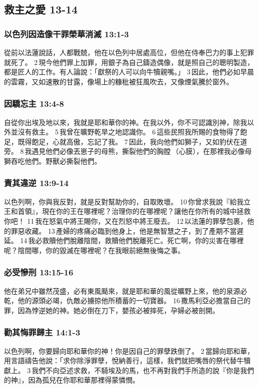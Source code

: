 \subsection{救主之愛 13-14}
\subsubsection{以色列因造像干罪榮華消滅 13:1-3}
從前以法蓮說話，人都戰兢，他在以色列中居處高位，但他在侍奉巴力的事上犯罪就死了。 2 現今他們罪上加罪，用銀子為自己鑄造偶像，就是照自己的聰明製造，都是匠人的工作。有人論說：「獻祭的人可以向牛犢親嘴。」 3 因此，他們必如早晨的雲霧，又如速散的甘露，像場上的糠秕被狂風吹去，又像煙氣騰於窗外。


\subsubsection{因驕忘主 13:4-8}
自從你出埃及地以來，我就是耶和華你的神。在我以外，你不可認識別神，除我以外並沒有救主。 5 我曾在曠野乾旱之地認識你。 6 這些民照我所賜的食物得了飽足，既得飽足，心就高傲，忘記了我。 7 因此，我向他們如獅子，又如豹伏在道旁。 8 我遇見他們必像丟崽子的母熊，撕裂他們的胸膛 （心膜），在那裡我必像母獅吞吃他們。野獸必撕裂他們。

\subsubsection{責其違逆 13:9-14}
以色列啊，你與我反對，就是反對幫助你的，自取敗壞。 10 你曾求我說『給我立王和首領』，現在你的王在哪裡呢？治理你的在哪裡呢？讓他在你所有的城中拯救你吧！ 11 我在怒氣中將王賜你，又在烈怒中將王廢去。 12 以法蓮的罪孽包裹，他的罪惡收藏。 13 產婦的疼痛必臨到他身上，他是無智慧之子，到了產期不當遲延。 14 我必救贖他們脫離陰間，救贖他們脫離死亡。死亡啊，你的災害在哪裡呢？陰間哪，你的毀滅在哪裡呢？在我眼前絕無後悔之事。

\subsubsection{必受慘刑 13:15-16}
他在弟兄中雖然茂盛，必有東風颳來，就是耶和華的風從曠野上來，他的泉源必乾，他的源頭必竭，仇敵必擄掠他所積蓄的一切寶器。 16 撒馬利亞必擔當自己的罪，因為悖逆她的神。她必倒在刀下，嬰孩必被摔死，孕婦必被剖開。

\subsubsection{勸其悔罪歸主 14:1-3}
以色列啊，你要歸向耶和華你的神！你是因自己的罪孽跌倒了。 2 當歸向耶和華，用言語禱告他說：「求你除淨罪孽，悅納善行，這樣，我們就把嘴唇的祭代替牛犢獻上。 3 我們不向亞述求救，不騎埃及的馬，也不再對我們手所造的說『你是我們的神』，因為孤兒在你耶和華那裡得蒙憐憫。

